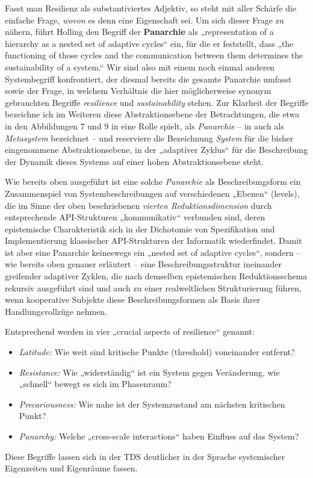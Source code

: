 \documentclass[11pt,a4paper]{article}
\begin{document}
Fasst man Resilienz als substantiviertes Adjektiv, so steht mit aller Schärfe
die einfache Frage, \emph{wovon} es denn eine Eigenschaft sei.  Um sich dieser
Frage zu nähern, führt Holling den Begriff der \textbf{Panarchie} als
„representation of a hierarchy as a nested set of adaptive cycles“ ein, für
die er feststellt, dass „the functioning of those cycles and the communication
between them determines the sustainability of a system.“ Wir sind also mit
einem noch einmal anderen Systembegriff konfrontiert, der diesmal bereits die
gesamte Panarchie umfasst sowie der Frage, in welchem Verhältnis die hier
möglicherweise synonym gebrauchten Begriffe \emph{resilience} und
\emph{sustainability} stehen. Zur Klarheit der Begriffe bezeichne ich im
Weiteren diese Abstraktionsebene der Betrachtungen, die etwa in den
Abbildungen 7 und 9 in \cite{Holling2000} eine Rolle spielt, als
\emph{Panarchie} -- in \cite{Brand2007} auch als \emph{Metasystem} bezeichnet
-- und reserviere die Bezeichnung \emph{System} für die bisher eingenommene
Abstraktionsebene, in der „adaptiver Zyklus“ für die Beschreibung der Dynamik
dieses Systems auf einer hohen Abstraktionsebene steht.

Wie bereits oben ausgeführt ist eine solche \emph{Panarchie} als
Beschreibungsform ein Zusammenspiel von Systembeschreibungen auf verschiedenen
„Ebenen“ (levels), die im Sinne der oben beschriebenen \emph{vierten
  Reduktionsdimension} durch entsprechende API-Strukturen „kommunikativ“
verbunden sind, deren epistemische Charakteristik sich in der Dichotomie von
Spezifikation und Implementierung klassischer API-Strukturen der Informatik
wiederfindet. Damit ist aber eine Panarchie keineswegs ein „nested set of
adaptive cycles“, sondern -- wie bereits oben genauer erläutert -- eine
Beschreibungsstruktur ineinander greifender adaptiver Zyklen, die nach
demselben epistemischen Reduktionsschema rekursiv ausgeführt sind und auch zu
einer realweltlichen Strukturierung führen, wenn kooperative Subjekte diese
Beschreibungsformen als Basis ihrer Handlungsvollzüge nehmen.

Entsprechend werden in \cite{Walker2004} vier „crucial aspects of resilience“
genannt:
\begin{itemize}[noitemsep]
\item \emph{Latitude:} Wie weit sind kritische Punkte (threshold) voneinander
  entfernt?
\item \emph{Resistance:} Wie „widerständig“ ist ein System gegen Veränderung,
  wie „schnell“ bewegt es sich im Phasenraum?
\item \emph{Precariousness:} Wie nahe ist der Systemzustand am nächsten
  kritischen Punkt?
\item \emph{Panarchy:} Welche „cross-scale interactions“ haben Einfluss auf
  das System?
\end{itemize}
Diese Begriffe lassen sich in der TDS deutlicher in der Sprache systemischer
Eigenzeiten und Eigenräume fassen.
\end{document}
